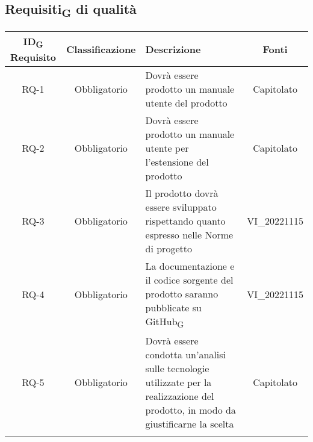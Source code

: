 \subsection{Requisiti\textsubscript{G} di qualità}
\setlength\extrarowheight{5pt}
\begin{tabularx}{\textwidth}{| c | c | X | c |} 
 \hline
 \rowcolor{white}
 \textbf{ID\textsubscript{G} Requisito} & \textbf{Classificazione} & \textbf{Descrizione} & \textbf{Fonti} \\
 \hline
 RQ-1 & Obbligatorio & Dovrà essere prodotto un manuale utente del prodotto & Capitolato\\
 \hline
 RQ-2 & Obbligatorio & Dovrà essere prodotto un manuale utente per l'estensione del prodotto &  Capitolato\\
 \hline
 RQ-3 & Obbligatorio & Il prodotto dovrà essere sviluppato rispettando quanto espresso nelle Norme di progetto & VI\_20221115\\
 \hline
 RQ-4 & Obbligatorio & La documentazione e il codice sorgente del prodotto saranno pubblicate su GitHub\textsubscript{G} & VI\_20221115\\
 \hline
 RQ-5 & Obbligatorio & Dovrà essere condotta un'analisi sulle tecnologie utilizzate per la realizzazione del prodotto, in modo da giustificarne la scelta & Capitolato\\
 \hline
 \rowcolor{white}
 \caption{Requisiti\textsubscript{G} di qualità}
\end{tabularx}

